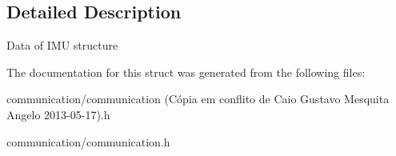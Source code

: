 \subsection{Detailed Description}
Data of IMU structure 

The documentation for this struct was generated from the following files:\begin{DoxyCompactItemize}
\item 
communication/communication (Cópia em conflito de Caio Gustavo Mesquita Angelo 2013-\/05-\/17).h\item 
communication/communication.h\end{DoxyCompactItemize}
